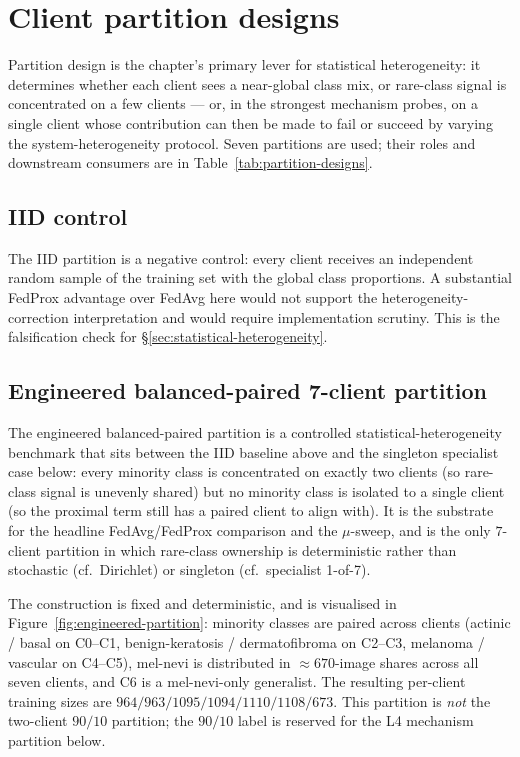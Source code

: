 \documentclass[11pt,a4paper]{report}
\begin{document}
\section{Client partition designs}
\label{sec:method-partitions}

Partition design is the chapter's primary lever for statistical
heterogeneity: it determines whether each client sees a near-global
class mix, or rare-class signal is concentrated on a few clients --- or,
in the strongest mechanism probes, on a single client whose
contribution can then be made to fail or succeed by varying the
system-heterogeneity protocol. Seven partitions are used; their roles
and downstream consumers are in Table~\ref{tab:partition-designs}.

\subsection{IID control}

The IID partition is a negative control: every client receives an
independent random sample of the training set with the global class
proportions. A substantial FedProx advantage over FedAvg here would
not support the heterogeneity-correction interpretation
\citep{li2020fedprox} and would require implementation scrutiny. This
is the falsification check for §\ref{sec:statistical-heterogeneity}.

\subsection{Engineered balanced-paired 7-client partition}

The engineered balanced-paired partition is a controlled
statistical-heterogeneity benchmark that sits between the IID baseline
above and the singleton specialist case below: every minority class is
concentrated on exactly two clients (so rare-class signal is unevenly
shared) but no minority class is isolated to a single client (so the
proximal term still has a paired client to align with). It is the
substrate for the headline FedAvg/FedProx comparison and the
$\mu$-sweep, and is the only $7$-client partition in which rare-class
ownership is deterministic rather than stochastic (cf.\ Dirichlet) or
singleton (cf.\ specialist 1-of-7).

The construction is fixed and deterministic, and is
visualised in Figure~\ref{fig:engineered-partition}: minority classes
are paired across clients (actinic / basal on C0--C1, benign-keratosis
/ dermatofibroma on C2--C3, melanoma / vascular on C4--C5), mel-nevi
is distributed in $\approx 670$-image shares across all seven clients,
and C6 is a mel-nevi-only generalist. The resulting per-client
training sizes are $964 / 963 / 1095 / 1094 / 1110 / 1108 / 673$.
This partition is \emph{not} the two-client $90/10$ partition; the
$90/10$ label is reserved for the L4 mechanism partition below.
\end{document}

